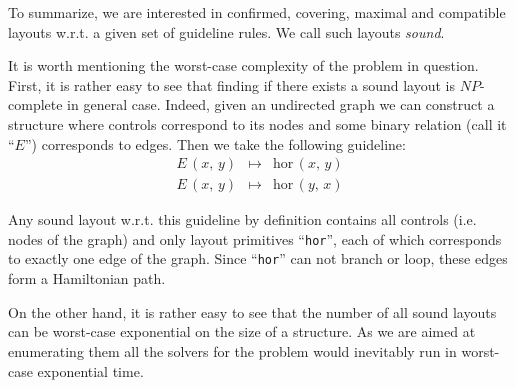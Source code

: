 To summarize, we are interested in confirmed, covering, maximal and compatible layouts w.r.t. a given
set of guideline rules. We call such layouts \emph{sound}.

It is worth mentioning the worst-case complexity of the problem in question. First, it is rather
easy to see that finding if there exists a sound layout is $NP$-complete in general case.
Indeed, given an undirected graph we can construct a structure where controls correspond to its nodes
and some binary relation (call it ``$E$'') corresponds to edges. Then we take the following guideline:
\[
\begin{array}{rcl}
  E\,(x,\, y) & \mapsto & \mbox{hor}\,(x,\, y)\\
  E\,(x,\, y) & \mapsto & \mbox{hor}\,(y,\, x)
\end{array}
\]

Any sound layout w.r.t. this guideline by definition contains all controls (i.e. nodes of the graph) and
only layout primitives ``\texttt{hor}'', each of which corresponds to exactly one edge of the graph. Since
``\texttt{hor}'' can not branch or loop, these edges form a Hamiltonian path.

On the other hand, it is rather easy to see that the number of all sound layouts can be worst-case
exponential on the size of a structure. As we are aimed at enumerating them all the solvers for
the problem would inevitably run in worst-case exponential time.


